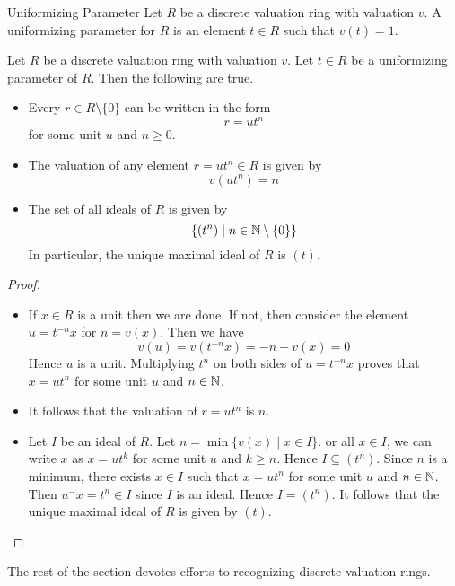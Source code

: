 \documentclass[a4paper]{article}
\begin{document}
\begin{defn}{Uniformizing Parameter}{} Let $R$ be a discrete valuation ring with valuation $v$. A uniformizing parameter for $R$ is an element $t\in R$ such that $v(t)=1$. 
\end{defn}

\begin{prp}{}{} Let $R$ be a discrete valuation ring with valuation $v$. Let $t\in R$ be a uniformizing parameter of $R$. Then the following are true. 
\begin{itemize}
\item Every $r\in R\setminus\{0\}$ can be written in the form $$r=ut^n$$ for some unit $u$ and $n\geq 0$. 
\item The valuation of any element $r=ut^n\in R$ is given by $$v(ut^n)=n$$
\item The set of all ideals of $R$ is given by $$\{(t^n)\;|\;n\in\mathbb{N}\setminus\{0\}\}$$ In particular, the unique maximal ideal of $R$ is $(t)$. 
\end{itemize} 
\begin{proof}~\\
\begin{itemize}
\item If $x\in R$ is a unit then we are done. If not, then consider the element $u=t^{-n}x$ for $n=v(x)$. Then we have $$v(u)=v(t^{-n}x)=-n+v(x)=0$$ Hence $u$ is a unit. Multiplying $t^n$ on both sides of $u=t^{-n}x$ proves that $x=ut^n$ for some unit $u$ and $n\in\mathbb{N}$. 
\item It follows that the valuation of $r=ut^n$ is $n$. 
\item Let $I$ be an ideal of $R$. Let $n=\min\{v(x)\;|\;x\in I\}$. or all $x\in I$, we can write $x$ as $x=ut^k$ for some unit $u$ and $k\geq n$. Hence $I\subseteq(t^n)$. Since $n$ is a minimum, there exists $x\in I$ such that $x=ut^n$ for some unit $u$ and $n\in\mathbb{N}$. Then $u^{-}x=t^n\in I$ since $I$ is an ideal. Hence $I=(t^n)$. It follows that the unique maximal ideal of $R$ is given by $(t)$. 
\end{itemize}
\end{proof}
\end{prp}

The rest of the section devotes efforts to recognizing discrete valuation rings. 
\end{document}
